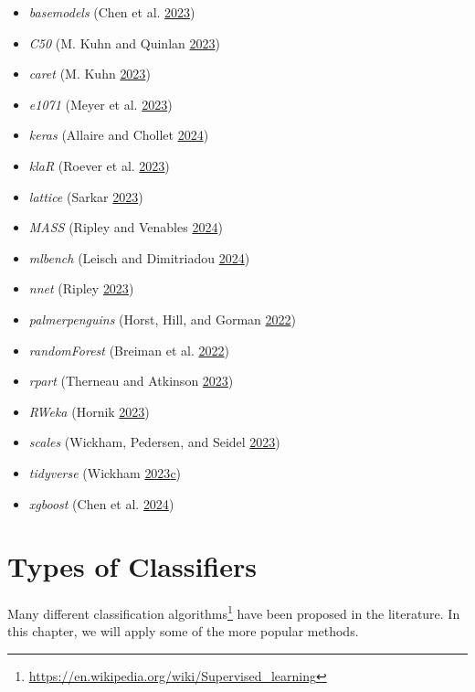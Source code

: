 \documentclass[
  notitlepage]{book}
\DeclareRobustCommand{\href}[2]{#2\footnote{\url{#1}}}
\providecommand{\tightlist}{%
  \setlength{\itemsep}{0pt}\setlength{\parskip}{0pt}}
\begin{document}
\begin{itemize}
\tightlist
\item
  \emph{basemodels} (Chen et al. \protect\hyperlink{ref-R-basemodels}{2023})
\item
  \emph{C50} (M. Kuhn and Quinlan \protect\hyperlink{ref-R-C50}{2023})
\item
  \emph{caret} (M. Kuhn \protect\hyperlink{ref-R-caret}{2023})
\item
  \emph{e1071} (Meyer et al. \protect\hyperlink{ref-R-e1071}{2023})
\item
  \emph{keras} (Allaire and Chollet \protect\hyperlink{ref-R-keras}{2024})
\item
  \emph{klaR} (Roever et al. \protect\hyperlink{ref-R-klaR}{2023})
\item
  \emph{lattice} (Sarkar \protect\hyperlink{ref-R-lattice}{2023})
\item
  \emph{MASS} (Ripley and Venables \protect\hyperlink{ref-R-MASS}{2024})
\item
  \emph{mlbench} (Leisch and Dimitriadou \protect\hyperlink{ref-R-mlbench}{2024})
\item
  \emph{nnet} (Ripley \protect\hyperlink{ref-R-nnet}{2023})
\item
  \emph{palmerpenguins} (Horst, Hill, and Gorman \protect\hyperlink{ref-R-palmerpenguins}{2022})
\item
  \emph{randomForest} (Breiman et al. \protect\hyperlink{ref-R-randomForest}{2022})
\item
  \emph{rpart} (Therneau and Atkinson \protect\hyperlink{ref-R-rpart}{2023})
\item
  \emph{RWeka} (Hornik \protect\hyperlink{ref-R-RWeka}{2023})
\item
  \emph{scales} (Wickham, Pedersen, and Seidel \protect\hyperlink{ref-R-scales}{2023})
\item
  \emph{tidyverse} (Wickham \protect\hyperlink{ref-R-tidyverse}{2023}\protect\hyperlink{ref-R-tidyverse}{c})
\item
  \emph{xgboost} (Chen et al. \protect\hyperlink{ref-R-xgboost}{2024})
\end{itemize}

\hypertarget{types-of-classifiers}{%
\section{Types of Classifiers}\label{types-of-classifiers}}

Many different \href{https://en.wikipedia.org/wiki/Supervised_learning}{classification algorithms}
have been proposed in the literature.
In this chapter, we will apply some of the more popular methods.
\end{document}
